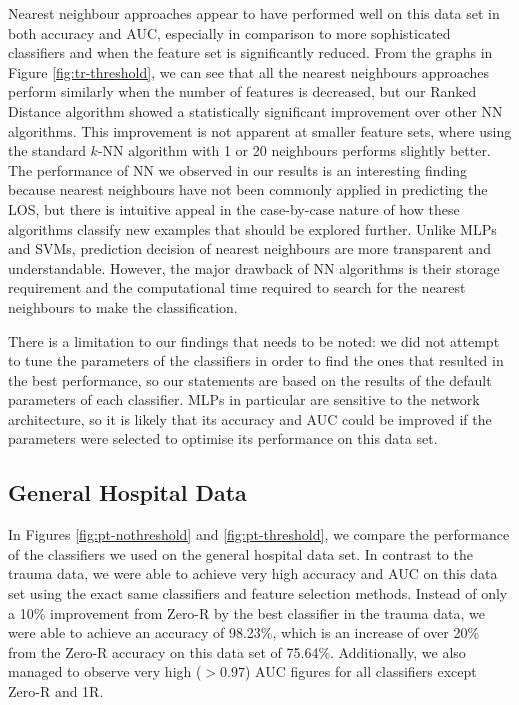 Nearest neighbour approaches appear to have performed well on this data set in
both accuracy and AUC, especially in comparison to more sophisticated
classifiers and when the feature set is significantly reduced. From the graphs
in Figure \ref{fig:tr-threshold}, we can see that all the nearest neighbours
approaches perform similarly when the number of features is decreased, but our
Ranked Distance algorithm showed a statistically significant improvement over
other NN algorithms. This
improvement is not apparent at smaller feature sets, where using the standard
$k$-NN algorithm with 1 or 20 neighbours performs slightly better.
The performance of NN we observed in our results is
an interesting finding because nearest neighbours have not been commonly
applied in predicting the LOS, but there is intuitive appeal in the
case-by-case nature of how these algorithms classify new examples that should
be explored further. Unlike MLPs and SVMs, prediction decision of nearest
neighbours are more transparent and understandable. However, the major drawback
of NN algorithms is their storage requirement and the computational time
required to search for the nearest neighbours to make the classification.

There is a limitation to our findings that needs to be noted: we did not
attempt to tune the parameters of the classifiers in order to find the ones
that resulted in the best performance, so our statements are based on the
results of the default parameters of each classifier.
MLPs in particular are sensitive to
the network architecture, so it is likely that its accuracy and AUC could be
improved if the parameters were selected to optimise its performance on this
data set.

\subsection{General Hospital Data}
In Figures \ref{fig:pt-nothreshold} and \ref{fig:pt-threshold}, we compare the
performance of the classifiers we used on the general hospital data set. In
contrast to the trauma data, we were able to achieve very high accuracy and
AUC on this data set using the exact same classifiers and feature selection
methods. Instead of only a 10\% improvement from Zero-R by the best classifier
in the trauma data, we were able to achieve an accuracy of 98.23\%, which is
an increase of over 20\% from the Zero-R accuracy on this data set of 75.64\%.
Additionally, we also managed to observe very high ($>0.97$) AUC figures for
all classifiers except Zero-R and 1R.


